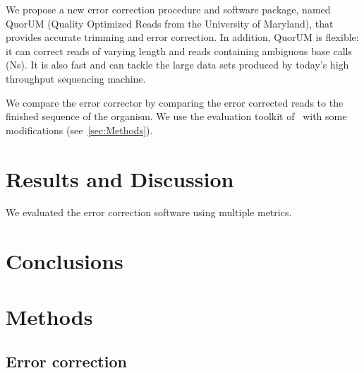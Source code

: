 \documentclass[10pt]{bmc_article}
\newenvironment{bmcformat}{\fussy\setboolean{publ}{true}}{\fussy}
\begin{document}
\begin{bmcformat}

We propose a new error correction procedure and software package, named QuorUM (Quality Optimized Reads from the University of Maryland), that provides accurate trimming and error correction.
In addition, QuorUM is flexible: it can correct reads of varying length and reads containing ambiguous base calls (Ns).
It is also fast and can tackle the large data sets produced by today's high throughput sequencing machine.

We compare the error corrector by comparing the error corrected reads to the finished sequence of the organism.
We use the evaluation toolkit of~\cite{Yang2012} with some modifications (see~\ref{sec:Methods}).

 
\section*{Results and Discussion}

We evaluated the error correction software using multiple metrics.



    

\section*{Conclusions}


  
\section*{Methods}
\label{sec:Methods}

\subsection*{Error correction}


\end{bmcformat}
\end{document}

